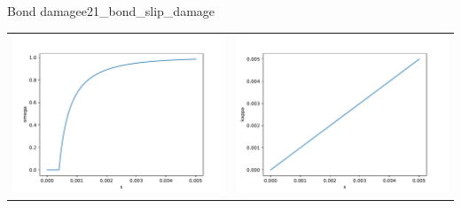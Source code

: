 \documentclass[main.tex]{subfiles}
\begin{document}
\begin{bmcsex}{Bond damage}{e21_bond_slip_damage}
\begin{center}
\noindent
\begin{longtable}{L{7.5cm}L{7.5cm}}
\includegraphics[width=7.5cm]{examples/e21_bond_slip_damage/fig_omega-s.pdf}
 & 
\includegraphics[width=7.5cm]{examples/e21_bond_slip_damage/fig_kappa-s.pdf}
 \\\end{longtable}
\end{center}
            \end{bmcsex}
\end{document}
